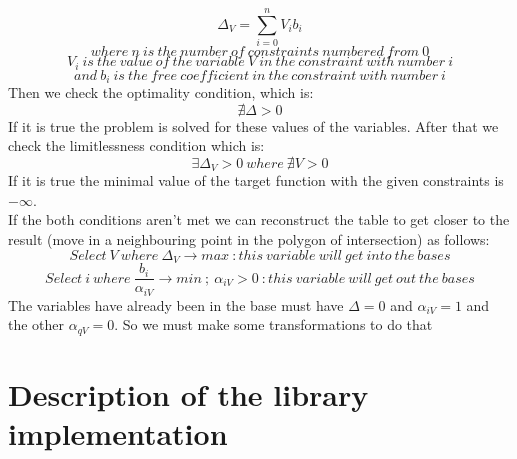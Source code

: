 \documentclass[]{article}
\begin{document}
			$$\Delta_V = \displaystyle\sum_{i=0}^{n} V_i b_i$$
			$$where\ n\ is\ the\ number\ of\ constraints\ numbered\ from\ 0$$
			$$V_i\ is\ the\ value\ of\ the\ variable\ V\ in\ the\ constraint\ with\ number\ i$$
			$$and\ b_i\ is\ the\ free\ coefficient\ in\ the\ constraint\ with\ number\ i$$
			Then we check the optimality condition, which is:
			$$\nexists\Delta > 0$$
			If it is true the problem is solved for these values of the variables.
			After that we check the limitlessness condition which is:
			$$\exists\Delta_V > 0\ where\ \nexists V > 0$$
			If it is true the minimal value of the target function with the given constraints is $-\infty$.\\
			If the both conditions aren't met we can reconstruct the table to get closer to the result (move in a neighbouring point in the polygon of intersection) as follows:\\
			$$Select\ V\ where\ \Delta_V \to max\ :this\ variable\ will\ get\ into\ the\ bases$$
			$$Select\ i\ where\ \frac{b_i}{\alpha_{iV}} \to min\ ;\ \alpha_{iV} > 0\ :this\ variable\ will\ get\ out\ the\ bases$$
			The variables have already been in the base must have $\Delta=0$ and $\alpha_{iV} = 1$ and the other $\alpha_{qV} = 0$. So we must make some transformations to do that


	\newpage

	\section{Description of the library implementation}
\end{document}
